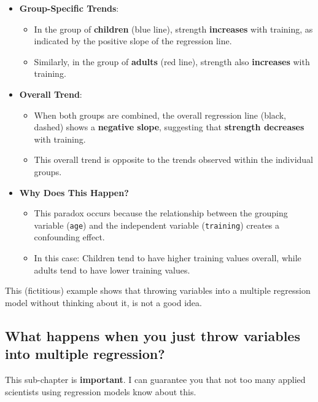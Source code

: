 \documentclass[
]{book}
\providecommand{\tightlist}{%
  \setlength{\itemsep}{0pt}\setlength{\parskip}{0pt}}
\begin{document}
\begin{itemize}
\tightlist
\item
  \textbf{Group-Specific Trends}:

  \begin{itemize}
  \tightlist
  \item
    In the group of \textbf{children} (blue line), strength \textbf{increases} with training, as indicated by the positive slope of the regression line.
  \item
    Similarly, in the group of \textbf{adults} (red line), strength also \textbf{increases} with training.
  \end{itemize}
\item
  \textbf{Overall Trend}:

  \begin{itemize}
  \tightlist
  \item
    When both groups are combined, the overall regression line (black, dashed) shows a \textbf{negative slope}, suggesting that \textbf{strength decreases} with training.
  \item
    This overall trend is opposite to the trends observed within the individual groups.
  \end{itemize}
\item
  \textbf{Why Does This Happen?}

  \begin{itemize}
  \tightlist
  \item
    This paradox occurs because the relationship between the grouping variable (\texttt{age}) and the independent variable (\texttt{training}) creates a confounding effect.
  \item
    In this case: Children tend to have higher training values overall,
    while adults tend to have lower training values.
  \end{itemize}
\end{itemize}

This (fictitious) example shows that throwing variables into a multiple regression
model without thinking about it, is not a good idea.

\subsection{What happens when you just throw variables into multiple regression?}\label{throwing_variables}

This sub-chapter is \textbf{important}. I can guarantee you that not too many applied
scientists using regression models know about this.
\end{document}
